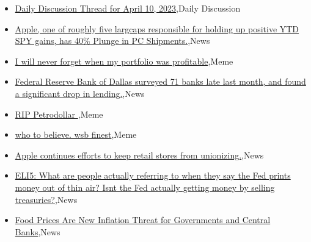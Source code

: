 \documentclass{article}%
\begin{document}
%
\begin{itemize}%
\item%
\href{https://reddit.com/r/wallstreetbets/comments/12hdxrv/daily\_discussion\_thread\_for\_april\_10\_2023/}{Daily Discussion Thread for April 10, 2023},Daily Discussion%
\item%
\href{https://reddit.com/r/wallstreetbets/comments/12hco06/apple\_one\_of\_roughly\_five\_largcaps\_responsible/}{Apple, one of roughly five largcaps responsible for holding up positive YTD SPY gains, has 40\% Plunge in PC Shipments.},News%
\item%
\href{https://reddit.com/r/wallstreetbets/comments/12hbgqu/i\_will\_never\_forget\_when\_my\_portfolio\_was/}{I will never forget when my portfolio was profitable},Meme%
\item%
\href{https://reddit.com/r/wallstreetbets/comments/12h9fu5/federal\_reserve\_bank\_of\_dallas\_surveyed\_71\_banks/}{Federal Reserve Bank of Dallas surveyed 71 banks late last month, and found a significant drop in lending.},News%
\item%
\href{https://reddit.com/r/wallstreetbets/comments/12h4zrz/rip\_petrodollar/}{RIP Petrodollar },Meme%
\item%
\href{https://reddit.com/r/wallstreetbets/comments/12h4d1p/who\_to\_believe\_wsb\_finest/}{ who to believe. wsb finest},Meme%
\item%
\href{https://reddit.com/r/Economics/comments/12hdw4u/apple\_continues\_efforts\_to\_keep\_retail\_stores/}{Apple continues efforts to keep retail stores from unionizing.},News%
\item%
\href{https://reddit.com/r/Economics/comments/12h2azq/eli5\_what\_are\_people\_actually\_referring\_to\_when/}{ELI5: What are people actually referring to when they say the Fed prints money out of thin air? Isnt the Fed actually getting money by selling treasuries?},News%
\item%
\href{https://reddit.com/r/Economics/comments/12h0f9y/food\_prices\_are\_new\_inflation\_threat\_for/}{Food Prices Are New Inflation Threat for Governments and Central Banks},News%
\end{itemize}%
\end{document}
